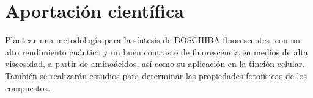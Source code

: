 \section{Aportación científica}
Plantear una metodología para la síntesis de \gls{BOSCHIBA} fluorescentes, con un alto rendimiento cuántico y un buen contraste de fluorescencia en medios de alta viscosidad, a partir de aminoácidos, así como su aplicación en la tinción celular. También se realizarán estudios \insilico{} para determinar las propiedades fotofísicas de los compuestos.

